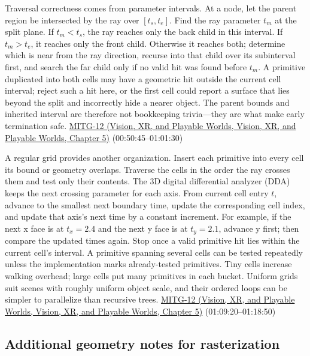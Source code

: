 Traversal correctness comes from parameter intervals. At a node, let the parent region be intersected by the ray over \([t_s,t_e]\). Find the ray parameter \(t_m\) at the split plane. If \(t_m<t_s\), the ray reaches only the back child in this interval. If \(t_m>t_e\), it reaches only the front child. Otherwise it reaches both; determine which is near from the ray direction, recurse into that child over its subinterval first, and search the far child only if no valid hit was found before \(t_m\). A primitive duplicated into both cells may have a geometric hit outside the current cell interval; reject such a hit here, or the first cell could report a surface that lies beyond the split and incorrectly hide a nearer object. The parent bounds and inherited interval are therefore not bookkeeping trivia---they are what make early termination safe. \href{../07-Vision-XR-and-Playable-Worlds/main.pdf\#nameddest=04-visual-computing-ii-ch036-mitg-12---ray-tracing-ii}{MITG-12 (Vision, XR, and Playable Worlds, Vision, XR, and Playable Worlds, Chapter 5)} (00:50:45--01:01:30)

A regular grid provides another organization. Insert each primitive into every cell its bound or geometry overlaps. Traverse the cells in the order the ray crosses them and test only their contents. The 3D digital differential analyzer (DDA) keeps the next crossing parameter for each axis. From current cell entry \(t\), advance to the smallest next boundary time, update the corresponding cell index, and update that axis's next time by a constant increment. For example, if the next x face is at \(t_x=2.4\) and the next y face is at \(t_y=2.1\), advance y first; then compare the updated times again. Stop once a valid primitive hit lies within the current cell's interval. A primitive spanning several cells can be tested repeatedly unless the implementation marks already-tested primitives. Tiny cells increase walking overhead; large cells put many primitives in each bucket. Uniform grids suit scenes with roughly uniform object scale, and their ordered loops can be simpler to parallelize than recursive trees. \href{../07-Vision-XR-and-Playable-Worlds/main.pdf\#nameddest=04-visual-computing-ii-ch036-mitg-12---ray-tracing-ii}{MITG-12 (Vision, XR, and Playable Worlds, Vision, XR, and Playable Worlds, Chapter 5)} (01:09:20--01:18:50)

\subsection{Additional geometry notes for rasterization}\label{04-visual-computing-ii-ch029-additional-geometry-notes-for-rasterization}


